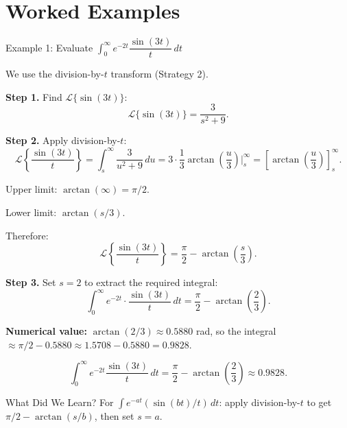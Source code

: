 \documentclass[12pt,a4paper]{article}
\begin{document}
\section{Worked Examples}

\begin{infobox}{Example 1: Evaluate $\displaystyle\int_0^\infty
    e^{-2t}\dfrac{\sin(3t)}{t}\, dt$}

We use the division-by-$t$ transform (Strategy 2).

\textbf{Step 1.} Find $\mathcal{L}\{\sin(3t)\}$:
\[
  \mathcal{L}\{\sin(3t)\} = \frac{3}{s^2+9}.
\]

\textbf{Step 2.} Apply division-by-$t$:
\[
  \mathcal{L}\!\left\{\frac{\sin(3t)}{t}\right\}
  = \int_s^\infty \frac{3}{u^2+9}\, du
  = 3\cdot\frac{1}{3}\arctan\!\left(\frac{u}{3}\right)\Big|_s^\infty
  = \left[\arctan\!\left(\frac{u}{3}\right)\right]_s^\infty.
\]

Upper limit: $\arctan(\infty) = \pi/2$.

Lower limit: $\arctan(s/3)$.

Therefore:
\[
  \mathcal{L}\!\left\{\frac{\sin(3t)}{t}\right\}
  = \frac{\pi}{2} - \arctan\!\left(\frac{s}{3}\right).
\]

\textbf{Step 3.} Set $s = 2$ to extract the required integral:
\[
  \int_0^\infty e^{-2t}\cdot\frac{\sin(3t)}{t}\, dt
  = \frac{\pi}{2} - \arctan\!\left(\frac{2}{3}\right).
\]

\textbf{Numerical value:} $\arctan(2/3) \approx 0.5880$ rad, so the integral
$\approx \pi/2 - 0.5880 \approx 1.5708 - 0.5880 = 0.9828$.

\[
  \boxed{\int_0^\infty e^{-2t}\frac{\sin(3t)}{t}\, dt
  = \frac{\pi}{2} - \arctan\!\left(\frac{2}{3}\right) \approx 0.9828.}
\]

\end{infobox}

\begin{learnbox}{What Did We Learn?}
For $\int e^{-at}(\sin(bt)/t)\,dt$: apply division-by-$t$ to get
$\pi/2 - \arctan(s/b)$, then set $s = a$.
\end{learnbox}
\end{document}
